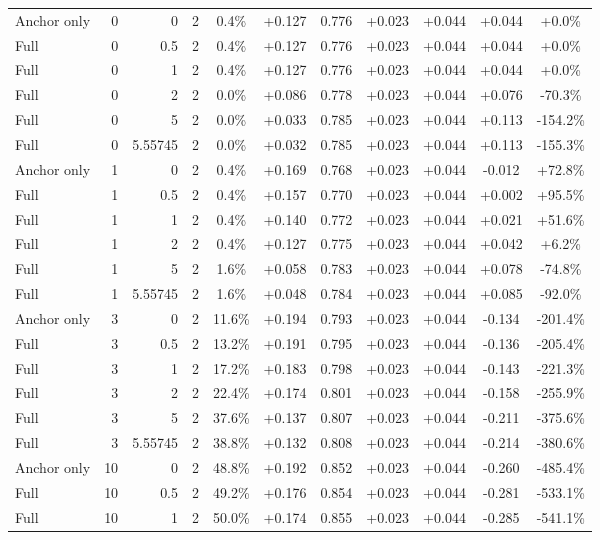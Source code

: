 \begin{table}[htbp]
\begin{tabular}{lrrrccccccc}
Anchor only & 0 & 0 & 2 & 0.4\% & +0.127 & 0.776 & +0.023 & +0.044 & +0.044 & +0.0\% \\
Full & 0 & 0.5 & 2 & 0.4\% & +0.127 & 0.776 & +0.023 & +0.044 & +0.044 & +0.0\% \\
Full & 0 & 1 & 2 & 0.4\% & +0.127 & 0.776 & +0.023 & +0.044 & +0.044 & +0.0\% \\
Full & 0 & 2 & 2 & 0.0\% & +0.086 & 0.778 & +0.023 & +0.044 & +0.076 & -70.3\% \\
Full & 0 & 5 & 2 & 0.0\% & +0.033 & 0.785 & +0.023 & +0.044 & +0.113 & -154.2\% \\
Full & 0 & 5.55745 & 2 & 0.0\% & +0.032 & 0.785 & +0.023 & +0.044 & +0.113 & -155.3\% \\
Anchor only & 1 & 0 & 2 & 0.4\% & +0.169 & 0.768 & +0.023 & +0.044 & -0.012 & +72.8\% \\
Full & 1 & 0.5 & 2 & 0.4\% & +0.157 & 0.770 & +0.023 & +0.044 & +0.002 & +95.5\% \\
Full & 1 & 1 & 2 & 0.4\% & +0.140 & 0.772 & +0.023 & +0.044 & +0.021 & +51.6\% \\
Full & 1 & 2 & 2 & 0.4\% & +0.127 & 0.775 & +0.023 & +0.044 & +0.042 & +6.2\% \\
Full & 1 & 5 & 2 & 1.6\% & +0.058 & 0.783 & +0.023 & +0.044 & +0.078 & -74.8\% \\
Full & 1 & 5.55745 & 2 & 1.6\% & +0.048 & 0.784 & +0.023 & +0.044 & +0.085 & -92.0\% \\
Anchor only & 3 & 0 & 2 & 11.6\% & +0.194 & 0.793 & +0.023 & +0.044 & -0.134 & -201.4\% \\
Full & 3 & 0.5 & 2 & 13.2\% & +0.191 & 0.795 & +0.023 & +0.044 & -0.136 & -205.4\% \\
Full & 3 & 1 & 2 & 17.2\% & +0.183 & 0.798 & +0.023 & +0.044 & -0.143 & -221.3\% \\
Full & 3 & 2 & 2 & 22.4\% & +0.174 & 0.801 & +0.023 & +0.044 & -0.158 & -255.9\% \\
Full & 3 & 5 & 2 & 37.6\% & +0.137 & 0.807 & +0.023 & +0.044 & -0.211 & -375.6\% \\
Full & 3 & 5.55745 & 2 & 38.8\% & +0.132 & 0.808 & +0.023 & +0.044 & -0.214 & -380.6\% \\
Anchor only & 10 & 0 & 2 & 48.8\% & +0.192 & 0.852 & +0.023 & +0.044 & -0.260 & -485.4\% \\
Full & 10 & 0.5 & 2 & 49.2\% & +0.176 & 0.854 & +0.023 & +0.044 & -0.281 & -533.1\% \\
Full & 10 & 1 & 2 & 50.0\% & +0.174 & 0.855 & +0.023 & +0.044 & -0.285 & -541.1\% \\

\end{tabular}
\end{table}

